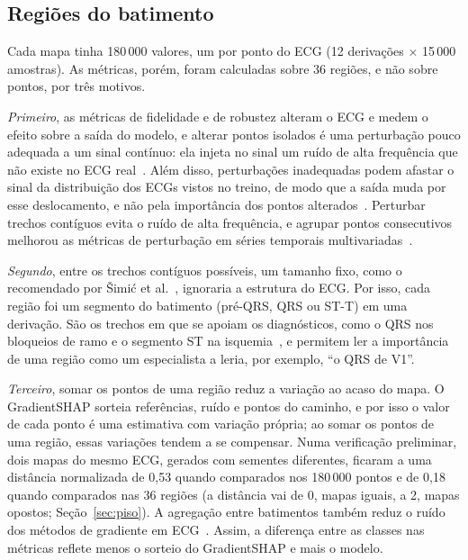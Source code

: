 \subsection{Regiões do batimento}\label{sec:regioes}
Cada mapa tinha 180\,000 valores, um por ponto do ECG (12 derivações × 15\,000 amostras). As métricas, porém, foram calculadas sobre 36 regiões, e não sobre pontos, por três motivos.

\emph{Primeiro}, as métricas de fidelidade e de robustez alteram o ECG e medem o efeito sobre a saída do modelo, e alterar pontos isolados é uma perturbação pouco adequada a um sinal contínuo: ela injeta no sinal um ruído de alta frequência que não existe no ECG real~\cite{cui2023}. Além disso, perturbações inadequadas podem afastar o sinal da distribuição dos ECGs vistos no treino, de modo que a saída muda por esse deslocamento, e não pela importância dos pontos alterados~\cite{simic2025}. Perturbar trechos contíguos evita o ruído de alta frequência, e agrupar pontos consecutivos melhorou as métricas de perturbação em séries temporais multivariadas~\cite{serramazza2024}.

\emph{Segundo}, entre os trechos contíguos possíveis, um tamanho fixo, como o recomendado por \v{S}imi\'{c} et al.~\cite{simic2025}, ignoraria a estrutura do ECG. Por isso, cada região foi um segmento do batimento (pré-QRS, QRS ou ST-T) em uma derivação. São os trechos em que se apoiam os diagnósticos, como o QRS nos bloqueios de ramo e o segmento ST na isquemia~\cite{gumpfer2026}, e permitem ler a importância de uma região como um especialista a leria, por exemplo, ``o QRS de V1''.

\emph{Terceiro}, somar os pontos de uma região reduz a variação ao acaso do mapa. O GradientSHAP sorteia referências, ruído e pontos do caminho, e por isso o valor de cada ponto é uma estimativa com variação própria; ao somar os pontos de uma região, essas variações tendem a se compensar. Numa verificação preliminar, dois mapas do mesmo ECG, gerados com sementes diferentes, ficaram a uma distância normalizada de 0,53 quando comparados nos 180\,000 pontos e de 0,18 quando comparados nas 36 regiões (a distância vai de 0, mapas iguais, a 2, mapas opostos; Seção~\ref{sec:piso}). A agregação entre batimentos também reduz o ruído dos métodos de gradiente em ECG~\cite{wagner2024}. Assim, a diferença entre as classes nas métricas reflete menos o sorteio do GradientSHAP e mais o modelo.

